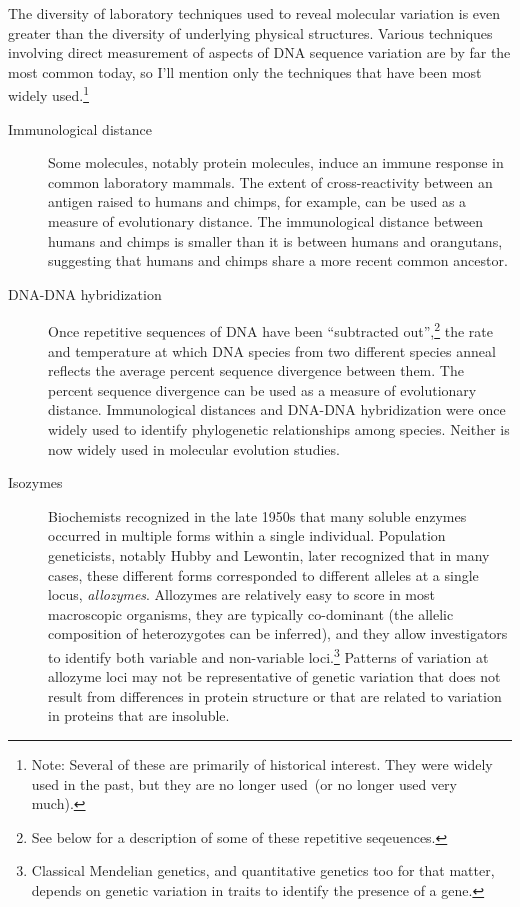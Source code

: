 \documentclass[12pt]{article}
\begin{document}
The diversity of laboratory techniques used to reveal molecular
variation is even greater than the diversity of underlying physical
structures. Various techniques involving direct measurement of aspects
of DNA sequence variation are by far the most common today, so I'll
mention only the techniques that have been most widely
used.\footnote{Note: Several of these are primarily of historical
  interest. They were widely used in the past, but they are no longer
  used~(or no longer used very much).}

\begin{description}

\item[Immunological distance] Some molecules, notably protein
  molecules, induce an immune response in common laboratory
  mammals. The extent of cross-reactivity between an antigen raised to
  humans and chimps, for example, can be used as a measure of
  evolutionary distance. The immunological distance between humans and
  chimps is smaller than it is between humans and orangutans,
  suggesting that humans and chimps share a more recent common
  ancestor.

\item[DNA-DNA hybridization] Once repetitive sequences of DNA have
  been ``subtracted out'',\footnote{See below for a description of
    some of these repetitive seqeuences.} the rate and temperature at
  which DNA species from two different species anneal reflects the
  average percent sequence divergence between them. The percent
  sequence divergence can be used as a measure of evolutionary
  distance. Immunological distances and DNA-DNA hybridization were
  once widely used to identify phylogenetic relationships among
  species. Neither is now widely used in molecular evolution
  studies.

\item[Isozymes] Biochemists recognized in the late 1950s that many
  soluble enzymes occurred in multiple forms within a single
  individual. Population geneticists, notably Hubby and Lewontin, later
  recognized that in many cases, these different forms corresponded to
  different alleles at a single locus, {\it allozymes}. Allozymes are
  relatively easy to score in most macroscopic organisms, they are
  typically co-dominant (the allelic composition of heterozygotes can
  be inferred), and they allow investigators to identify both variable
  and non-variable loci.\footnote{Classical Mendelian genetics, and
    quantitative genetics too for that matter, depends on genetic
    variation in traits to identify the presence of a gene.} Patterns
  of variation at allozyme loci may not be representative of genetic
  variation that does not result from differences in protein structure
  or that are related to variation in proteins that are
  insoluble.


\end{description}
\end{document}
